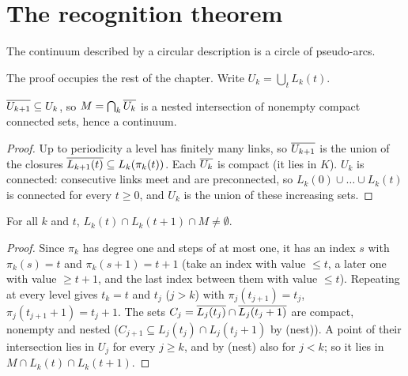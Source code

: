 
\section{The recognition theorem}

\begin{theorem}\label{thm:circdescr}
The continuum described by a circular description is a circle of pseudo-arcs.
\end{theorem}


The proof occupies the rest of the chapter. Write $U_k=\bigcup_tL_k(t)$.

\begin{lemma}[$M$ is a continuum]\label{lem:cd-continuum}
$\overline{U_{k+1}}\subseteq U_k$, so $M=\bigcap_k\overline{U_k}$ is a nested intersection of nonempty compact connected sets, hence a continuum.
\end{lemma}

\begin{proof}
Up to periodicity a level has finitely many links, so $\overline{U_{k+1}}$ is the union of the closures $\overline{L_{k+1}(t)}\subseteq L_k(\pi_k(t))$. Each $\overline{U_k}$ is compact (it lies in
$K$). $U_k$ is connected: consecutive links meet and are preconnected, so $L_k(0)\cup\dots\cup L_k(t)$ is connected for every $t\ge0$, and $U_k$ is the union of these increasing
sets.
\end{proof}


\begin{lemma}\label{lem:cd-meet}
For all $k$ and $t$, $L_k(t)\cap L_k(t+1)\cap M\neq\emptyset$.
\end{lemma}

\begin{proof}
Since $\pi_k$ has degree one and steps of at most one, it has an index $s$ with $\pi_k(s)=t$ and $\pi_k(s+1)=t+1$ (take an index with value $\le t$, a later one with value $\ge t+1$, and
the last index between them with value $\le t$). Repeating at every level gives $t_k=t$ and $t_j$ ($j>k$) with $\pi_j(t_{j+1})=t_j$, $\pi_j(t_{j+1}+1)=t_j+1$. The sets
$C_j=\overline{L_j(t_j)}\cap\overline{L_j(t_j+1)}$ are compact, nonempty and nested ($C_{j+1}\subseteq L_j(t_j)\cap L_j(t_j+1)$ by (nest)). A point of their intersection lies in $U_j$ for every
$j\ge k$, and by (nest) also for $j<k$; so it lies in $M\cap L_k(t)\cap L_k(t+1)$.
\end{proof}

